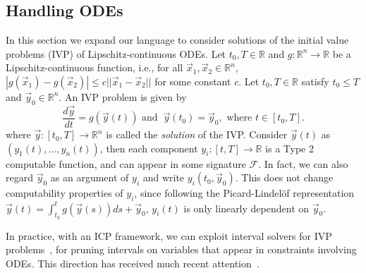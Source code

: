 \documentclass[envcountsect]{llncs}
\begin{document}
\subsection{Handling ODEs}
In this section we expand our language to consider solutions of the initial value problems (IVP) of Lipschitz-continuous ODEs. Let $t_0, T\in \mathbb{R}$ and $g:\mathbb{R}^n\rightarrow \mathbb{R}$ be a Lipschitz-continuous function, i.e., for all $\vec x_1, \vec x_2\in\mathbb{R}^n$, $|g(\vec x_1)-g(\vec x_2)|\leq c||\vec x_1-\vec x_2||$ for some constant $c$. Let $t_0, T\in \mathbb{R}$ satisfy $t_0\leq T$ and $\vec y_0\in \mathbb{R}^n$. An IVP problem is given by 
$$\frac{d\vec y}{dt} = g(\vec y(t))\mbox{ and } \ \vec y(t_0) = \vec y_0, \mbox{ where }t\in [t_0, T].$$
where $\vec y: [t_0, T]\rightarrow \mathbb{R}^n$ is called the {\em solution} of the IVP. Consider $\vec y(t)$ as $(y_1(t),...,y_n(t))$, then each component $y_i: [t, T]\rightarrow \mathbb{R}$ is a Type 2 computable function, and can appear in some signature $\mathcal{F}$. In fact, we can also regard $\vec y_0$ as an argument of $y_i$ and write $y_i(t_0, \vec y_0)$. This does not change computability properties of $y_i$, since following the Picard-Lindel\"of representation $\vec y(t) = \int_{t_0}^t g(\vec y(s))ds + \vec y_0$, $y_i(t)$ is only linearly dependent on $\vec y_0$. 

In practice, with an ICP framework, we can exploit interval solvers for IVP problems~\cite{DBLP:journals/amc/NedialkovJC99}, for pruning intervals on variables that appear in constraints involving ODEs. This direction has received much recent attention~\cite{DBLP:conf/sefm/EggersRNF11,DBLP:conf/atva/EggersFH08,DBLP:conf/cp/GoldsztejnMEH10,DBLP:journals/sttt/IshiiUH11}. 
\end{document}
